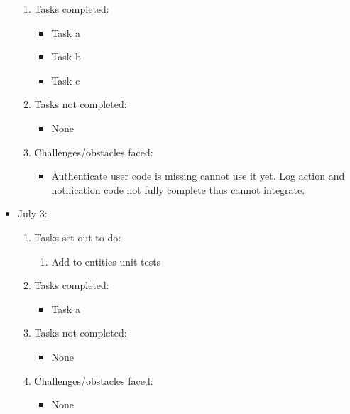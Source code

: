 \documentclass[12pt]{article}
\begin{document}
\begin{itemize}
\begin{enumerate}
		\item Tasks completed:
		\begin{itemize}
			\item Task a
			\item Task b
			\item Task c								
		\end{itemize}
		\item Tasks not completed:
		\begin{itemize}
			\item None
		\end{itemize}
		\item Challenges/obstacles faced:
		\begin{itemize}
			\item Authenticate user code is missing cannot use it yet. Log action and notification code not fully complete thus cannot integrate.
		\end{itemize}			
	\end{enumerate}
	\item July 3:
	\begin{enumerate}
		\item Tasks set out to do:
		\begin{enumerate}
			\item Add to entities unit tests			
		\end{enumerate}
		\item Tasks completed:
		\begin{itemize}
			\item Task a								
		\end{itemize}
		\item Tasks not completed:
		\begin{itemize}
			\item None
		\end{itemize}
		\item Challenges/obstacles faced:
		\begin{itemize}
			\item None
		\end{itemize}			
	\end{enumerate}
\end{itemize}
\end{document}
